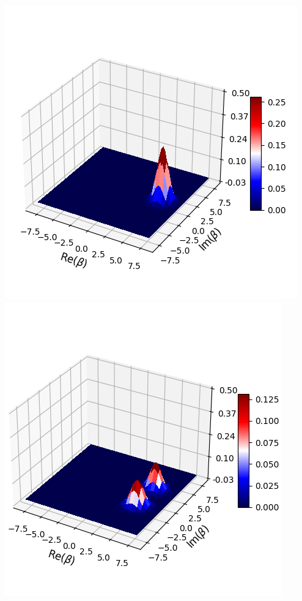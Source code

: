 \documentclass[11pt, oneside]{book}
\theoremstyle{break}
\theoremstyle{break}
\begin{document}
\begin{center}
\includegraphics[scale=0.4]{542HW6/Q(0)}
\includegraphics[scale=0.4]{542HW6/Q(5)}

\end{center}
\end{document}
